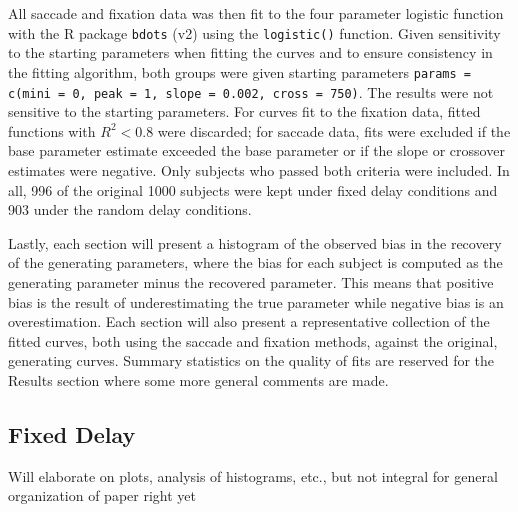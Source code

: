 \documentclass{article}
\newcommand{\xt}{\texttt}%
\begin{document}
All saccade and fixation data was then fit to the four parameter logistic function with the R package \xt{bdots} (v2) using the \xt{logistic()} function. Given sensitivity to the starting parameters when fitting the curves and to ensure consistency in the fitting algorithm, both groups were given starting parameters \xt{params = c(mini = 0, peak = 1, slope = 0.002,  cross = 750)}. The results were not sensitive to the starting parameters. For curves fit to the fixation data, fitted functions with $R^2 < 0.8$ were discarded; for saccade data, fits were excluded if the base parameter estimate exceeded the base parameter or if the slope or crossover estimates were negative. Only subjects who passed both criteria were included. In all, 996 of the original 1000 subjects were kept under fixed delay conditions and 903 under the random delay conditions.

Lastly, each section will present a histogram of the observed bias in the recovery of the generating parameters, where the bias for each subject is computed as the generating parameter minus the recovered parameter. This means that positive bias is the result of underestimating the true parameter while negative bias is an overestimation. Each section will also present a representative collection of the fitted curves, both using the saccade and fixation methods, against the original, generating curves. Summary statistics on the quality of fits are reserved for the Results section where some more general comments are made. 


\subsection{Fixed Delay}

Will elaborate on plots, analysis of histograms, etc., but not integral for general organization of paper right yet
\end{document}
